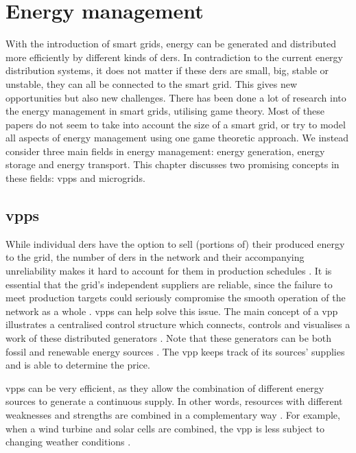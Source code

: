 \section{Energy management}\label{em}
\acresetall
With the introduction of smart grids, energy can be generated and distributed more efficiently by different kinds of \acp{der}. 
In contradiction to the current energy distribution systems, it does not matter if these \acp{der} are small, big, stable or unstable, they can all be connected to the smart grid. This gives new opportunities but also new challenges.
There has been done a lot of research into the energy management in smart grids, utilising game theory\cite{WangOuyangKrishnanEtAl2015, TusharZhangSmithEtAl2013}. Most of these papers do not seem to take into account the size of a smart grid, or try to model all aspects of energy management using one game theoretic approach. We instead consider three main fields in energy management: energy generation, energy storage and energy transport. This chapter discusses two promising concepts in these fields: \acp{vpp} and microgrids. 

\subsection{\aclp{vpp}}\label{vpp}
While individual \acp{der} have the option to sell (portions of) their produced energy to the grid, the number of \acp{der} in the network and their accompanying unreliability makes it hard to account for them in production schedules \cite{RobuKotaChalkiadakisEtAl2012}. It is essential that the grid's independent suppliers are reliable, since the failure to meet production targets could seriously compromise the smooth operation of the network as a whole \cite{ChalkiadakisRobuKotaEtAl2011}. \acp{vpp} can help solve this issue. The main concept of a \ac{vpp} illustrates a centralised control structure which connects, controls and visualises a work of these distributed generators \cite{NikonowiczMilewski2012}. Note that these generators can be both fossil and renewable energy sources \cite{LombardiPowalkoRudion2009}. The \ac{vpp} keeps track of its sources' supplies and is able to determine the price. 

\acp{vpp} can be very efficient, as they allow the combination of different energy sources to generate a continuous supply. In other words, resources with different weaknesses and strengths are combined in a complementary way \cite{Koeppel2003}. For example, when a wind turbine and solar cells are combined, the \ac{vpp} is less subject to changing weather conditions \cite{Tromly2001, Kumagai2012, MashhourMoghaddas-Tafreshi2011, NikonowiczMilewski2012}. 

